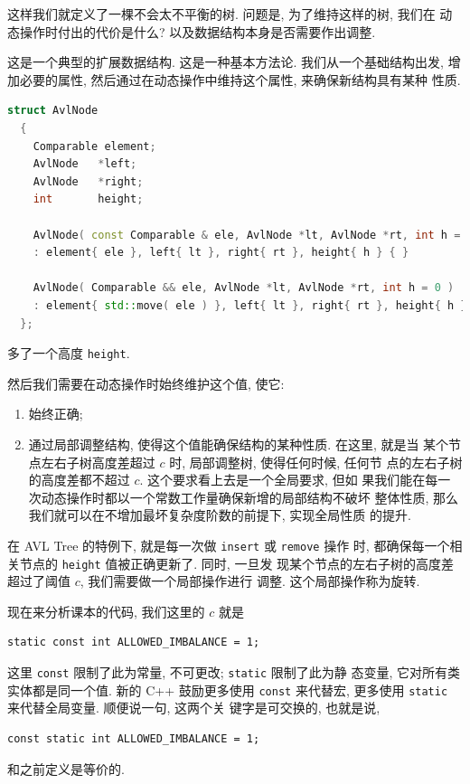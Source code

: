 \documentclass[a4paper]{ctexart}
\theoremstyle{definition}
\theoremstyle{definition}
\begin{document}
这样我们就定义了一棵不会太不平衡的树. 问题是, 为了维持这样的树, 我们在
动态操作时付出的代价是什么? 以及数据结构本身是否需要作出调整.

这是一个典型的扩展数据结构. 这是一种基本方法论. 我们从一个基础结构出发,
增加必要的属性, 然后通过在动态操作中维持这个属性, 来确保新结构具有某种
性质.

\begin{lstlisting}[language=C++]
  struct AvlNode
  {
    Comparable element;
    AvlNode   *left;
    AvlNode   *right;
    int       height;

    AvlNode( const Comparable & ele, AvlNode *lt, AvlNode *rt, int h = 0 )
    : element{ ele }, left{ lt }, right{ rt }, height{ h } { }
    
    AvlNode( Comparable && ele, AvlNode *lt, AvlNode *rt, int h = 0 )
    : element{ std::move( ele ) }, left{ lt }, right{ rt }, height{ h } { }
  };
\end{lstlisting}

多了一个高度 \verb|height|. 

然后我们需要在动态操作时始终维护这个值, 使它:
\begin{enumerate}
\item 始终正确;
\item 通过局部调整结构, 使得这个值能确保结构的某种性质. 在这里, 就是当
  某个节点左右子树高度差超过 $c$ 时, 局部调整树, 使得任何时候, 任何节
  点的左右子树的高度差都不超过 $c$. 这个要求看上去是一个全局要求, 但如
  果我们能在每一次动态操作时都以一个常数工作量确保新增的局部结构不破坏
  整体性质, 那么我们就可以在不增加最坏复杂度阶数的前提下, 实现全局性质
  的提升. 
\end{enumerate}

在 AVL Tree 的特例下, 就是每一次做 \verb|insert| 或 \verb|remove| 操作
时, 都确保每一个相关节点的 \verb|height| 值被正确更新了. 同时, 一旦发
现某个节点的左右子树的高度差超过了阈值 $c$, 我们需要做一个局部操作进行
调整. 这个局部操作称为旋转.

现在来分析课本的代码, 我们这里的 $c$ 就是
\begin{verbatim}
static const int ALLOWED_IMBALANCE = 1;
\end{verbatim}
这里 \verb|const| 限制了此为常量, 不可更改; \verb|static| 限制了此为静
态变量, 它对所有类实体都是同一个值. 新的 C++ 鼓励更多使用 \verb|const|
来代替宏, 更多使用 \verb|static| 来代替全局变量. 顺便说一句, 这两个关
键字是可交换的, 也就是说,
\begin{verbatim}
const static int ALLOWED_IMBALANCE = 1;
\end{verbatim}
和之前定义是等价的.
\end{document}
